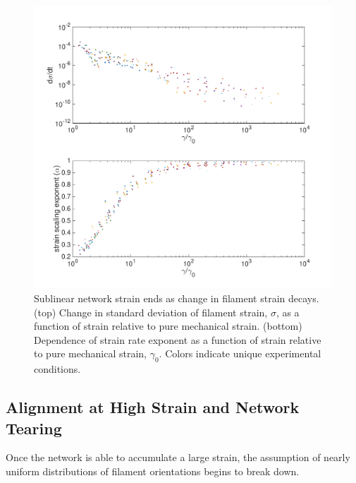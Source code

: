\begin{figure}[h!]
\centering
\includegraphics[width=\hsize]{slippage/collapse}
\caption[Sublinear network strain ends as change in filament strain decays.]{\label{fig:strain_coll} Sublinear network strain ends as change in filament strain decays. (top) Change in standard deviation of filament strain, $\sigma$, as a function of strain relative to pure mechanical strain. (bottom)   Dependence of strain rate exponent as a function of strain relative to pure mechanical strain, $\gamma_0$.  Colors indicate unique experimental conditions. }
\end{figure}




















\subsection{Alignment at High Strain and Network Tearing}

Once the network is able to accumulate a large strain, the assumption of nearly uniform distributions of filament orientations begins to break down.

